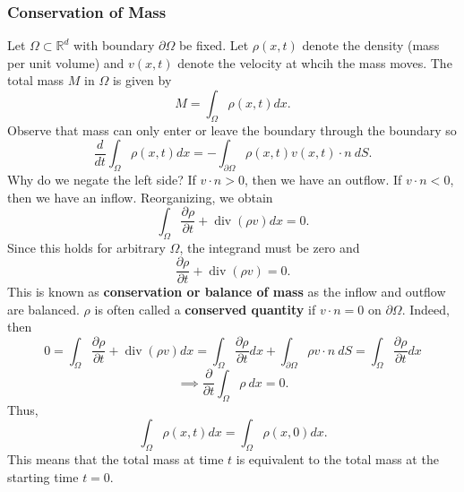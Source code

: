 \documentclass{article}
\theoremstyle{definition}
\theoremstyle{definition}
\newcommand{\R}{\mathbb{R}}
\begin{document}
\subsubsection{Conservation of Mass}
Let $\Omega\subset \R^d$ with boundary $\partial \Omega$ be fixed. Let $\rho(x,t)$ denote the density (mass per unit volume) and $v(x,t)$ denote the velocity at whcih the mass moves. The total mass $M$ in $\Omega$ is given by
$$M=\int_{\Omega}\rho(x,t)dx.$$
Observe that mass can only enter or leave the boundary through the boundary so
$$\frac{d}{dt}\int_{\Omega}\rho(x,t)dx=-\int_{\partial \Omega}\rho(x,t)v(x,t)\cdot n\:dS.$$
Why do we negate the left side? If $v\cdot n>0$, then we have an outflow. If $v\cdot n<0$, then we have an inflow. Reorganizing, we obtain
$$\int_{\Omega}\frac{\partial \rho}{\partial t}+\operatorname{div}(\rho v)dx=0.$$
Since this holds for arbitrary $\Omega$, the integrand must be zero and
$$\frac{\partial \rho}{\partial t}+\operatorname{div}(\rho v)=0.$$
This is known as \textbf{conservation or balance of mass} as the inflow and outflow are balanced. $\rho$ is often called a \textbf{conserved quantity} if $v\cdot n=0$ on $\partial \Omega$. Indeed, then
$$0=\int_{\Omega}\frac{\partial \rho}{\partial t}+\operatorname{div}(\rho v)dx=\int_{\Omega}\frac{\partial \rho}{\partial t}dx+\int_{\partial \Omega}\rho v\cdot n\:dS=\int_{\Omega}\frac{\partial \rho}{\partial t}dx$$
$$\implies \frac{\partial}{\partial t}\int_{\Omega}\rho\:dx=0.$$
Thus,
$$\int_{\Omega}\rho(x,t)dx=\int_{\Omega}\rho(x,0)dx.$$
This means that the total mass at time $t$ is equivalent to the total mass at the starting time $t=0$.
\end{document}

